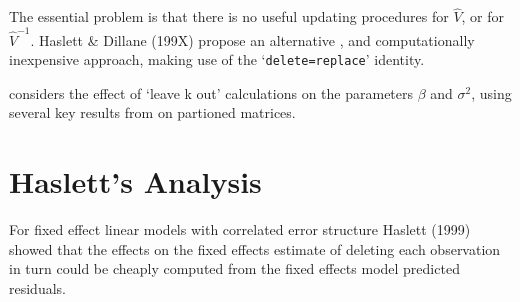 \documentclass[Main.tex]{subfiles}
\begin{document}
The essential problem is that there is no
useful updating procedures for $\hat{V}$, or for $\hat{V}^{-1}$.
Haslett \& Dillane (199X) propose an alternative , and
computationally inexpensive approach, making use of the
`\texttt{delete=replace}' identity.

\citet{Haslett99} considers the effect of `leave k out'
calculations on the parameters $\beta$ and $\sigma^{2}$, using
several key results from \citet{HaslettHayes} on partioned
matrices.



\newpage
\section{Haslett's Analysis} %
For fixed effect linear models with correlated error structure Haslett (1999) showed that the effects on
the fixed effects estimate of deleting each observation in turn could be cheaply computed from the fixed effects model predicted residuals.


\end{document}

